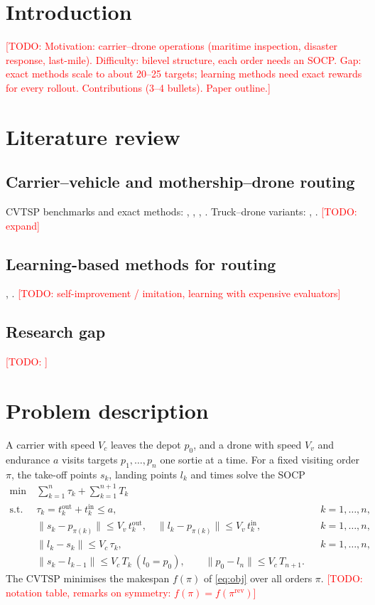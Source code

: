 \documentclass[preprint,review,12pt,authoryear]{elsarticle}
\newcommand{\todo}[1]{\textcolor{red}{[TODO: #1]}}
\begin{document}
\section{Introduction}\label{sec:intro}
\todo{Motivation: carrier--drone operations (maritime inspection, disaster response, last-mile).
Difficulty: bilevel structure, each order needs an SOCP. Gap: exact methods scale to about 20--25 targets;
learning methods need exact rewards for every rollout. Contributions (3--4 bullets). Paper outline.}

\section{Literature review}\label{sec:lit}
\subsection{Carrier--vehicle and mothership--drone routing}
CVTSP benchmarks and exact methods: \citet{gambella2018exact}, \citet{erdogan2021exact},
\citet{poikonen2020mothership}, \citet{li2025exact}. Truck--drone variants: \citet{murray2015flying},
\citet{agatz2018optimization}. \todo{expand}
\subsection{Learning-based methods for routing}
\citet{kool2019attention}, \citet{kwon2020pomo}. \todo{self-improvement / imitation, learning with expensive evaluators}
\subsection{Research gap}
\todo{}

\section{Problem description}\label{sec:problem}
A carrier with speed $V_c$ leaves the depot $p_0$, and a drone with speed $V_v$ and endurance $a$
visits targets $p_1,\dots,p_n$ one sortie at a time. For a fixed visiting order $\pi$, the take-off
points $s_k$, landing points $l_k$ and times solve the SOCP
\begin{align}
\min\ & \sum_{k=1}^{n} \tau_k + \sum_{k=1}^{n+1} T_k \label{eq:obj}\\
\text{s.t.}\ & \tau_k = t^{\mathrm{out}}_k + t^{\mathrm{in}}_k \le a, && k=1,\dots,n,\\
& \|s_k - p_{\pi(k)}\| \le V_v\, t^{\mathrm{out}}_k,\quad \|l_k - p_{\pi(k)}\| \le V_v\, t^{\mathrm{in}}_k, && k=1,\dots,n,\\
& \|l_k - s_k\| \le V_c\, \tau_k, && k=1,\dots,n,\\
& \|s_k - l_{k-1}\| \le V_c\, T_k \ (l_0 = p_0), \qquad \|p_0 - l_n\| \le V_c\, T_{n+1}. &&
\end{align}
The CVTSP minimises the makespan $f(\pi)$ of \eqref{eq:obj} over all orders $\pi$. \todo{notation table, remarks on symmetry: $f(\pi)=f(\pi^{\mathrm{rev}})$}
\end{document}
